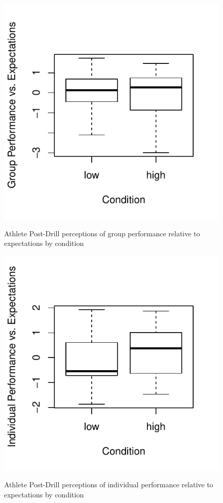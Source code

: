 \begin{figure}
  \centering
  \includegraphics[width=0.5\linewidth,keepaspectratio] {images/groupPerfExpPostBoxPlot-1}
          \label{fig:groupPerfExpPostBoxPlot}
        \caption{Athlete Post-Drill perceptions of group performance relative to expectations by condition}
\end{figure}


\begin{figure}
  \centering
      \includegraphics[width=0.5\linewidth,keepaspectratio] {images/indPerfExpPostBoxPlot-1}
              \label{fig:indPerfExpPostBoxPlot}
              \caption{Athlete Post-Drill perceptions of individual performance relative to expectations by condition}
\end{figure}













